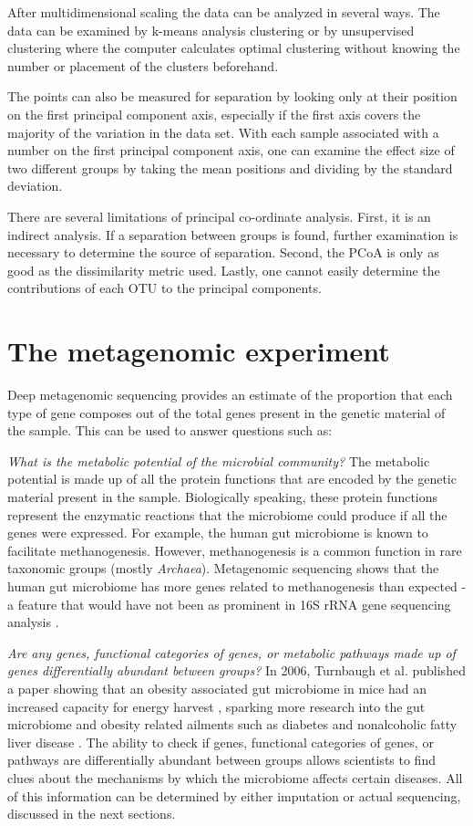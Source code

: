After multidimensional scaling the data can be analyzed in several ways. The data can be examined by k-means analysis clustering \cite{tibshirani2005cluster} or by unsupervised clustering where the computer calculates optimal clustering without knowing the number or placement of the clusters beforehand.

The points can also be measured for separation by looking only at their position on the first principal component axis, especially if the first axis covers the majority of the variation in the data set. With each sample associated with a number on the first principal component axis, one can examine the effect size of two different groups by taking the mean positions and dividing by the standard deviation.

There are several limitations of principal co-ordinate analysis. First, it is an indirect analysis. If a separation between groups is found, further examination is necessary to determine the source of separation. Second, the PCoA is only as good as the dissimilarity metric used. Lastly, one cannot easily determine the contributions of each OTU to the principal components.

\section{The metagenomic experiment}
Deep metagenomic sequencing provides an estimate of the proportion that each type of gene composes out of the total genes present in the genetic material of the sample. This can be used to answer questions such as:

\textit{What is the metabolic potential of the microbial community?}
The metabolic potential is made up of all the protein functions that are encoded by the genetic material present in the sample. Biologically speaking, these protein functions represent the enzymatic reactions that the microbiome could produce if all the genes were expressed. For example, the human gut microbiome is known to facilitate methanogenesis. However, methanogenesis is a common function in rare taxonomic groups (mostly \textit{Archaea}). Metagenomic sequencing shows that the human gut microbiome has more genes related to methanogenesis than expected - a feature that would have not been as prominent in 16S rRNA gene sequencing analysis \cite{gill2006metagenomic}.

\textit{Are any genes, functional categories of genes, or metabolic pathways made up of genes differentially abundant between groups?}
In 2006, Turnbaugh et al. published a paper showing that an obesity associated gut microbiome in mice had an increased capacity for energy harvest \cite{turnbaugh2006obesity}, sparking more research into the gut microbiome and obesity related ailments such as diabetes \cite{larsen2010gut} and nonalcoholic fatty liver disease \cite{zhu2013characterization}. The ability to check if genes, functional categories of genes, or pathways are differentially abundant between groups allows scientists to find clues about the mechanisms by which the microbiome affects certain diseases. All of this information can be determined by either imputation or actual sequencing, discussed in the next sections.

